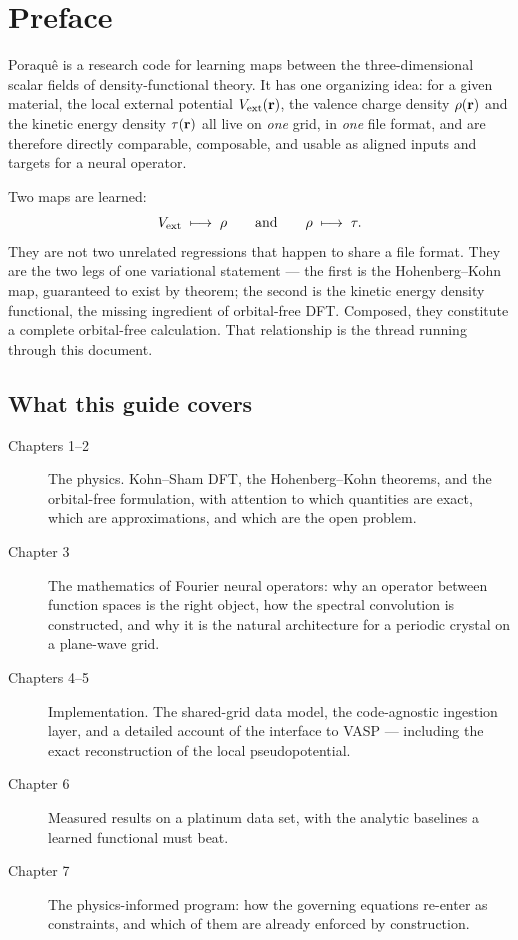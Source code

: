 \chapter*{Preface}

Poraqu\^e is a research code for learning maps between the three-dimensional
scalar fields of density-functional theory. It has one organizing idea: for a
given material, the local external potential $V_{\mathrm{ext}}(\mathbf{r})$, the valence charge
density $\rho(\mathbf{r})$ and the kinetic energy density $\tau(\mathbf{r})$ all live on
\emph{one} grid, in \emph{one} file format, and are therefore directly
comparable, composable, and usable as aligned inputs and targets for a neural
operator.

Two maps are learned:
\[
  V_{\mathrm{ext}} \;\longmapsto\; \rho
  \qquad\text{and}\qquad
  \rho \;\longmapsto\; \tau .
\]
They are not two unrelated regressions that happen to share a file format. They
are the two legs of one variational statement --- the first is the
Hohenberg--Kohn map, guaranteed to exist by theorem; the second is the kinetic
energy density functional, the missing ingredient of orbital-free DFT. Composed,
they constitute a complete orbital-free calculation. That relationship is the
thread running through this document.

\section*{What this guide covers}

\begin{description}
  \item[Chapters 1--2] The physics. Kohn--Sham DFT, the Hohenberg--Kohn
    theorems, and the orbital-free formulation, with attention to which
    quantities are exact, which are approximations, and which are the open
    problem.
  \item[Chapter 3] The mathematics of Fourier neural operators: why an operator
    between function spaces is the right object, how the spectral convolution
    is constructed, and why it is the natural architecture for a periodic
    crystal on a plane-wave grid.
  \item[Chapters 4--5] Implementation. The shared-grid data model, the
    code-agnostic ingestion layer, and a detailed account of the interface to
    VASP --- including the exact reconstruction of the local pseudopotential.
  \item[Chapter 6] Measured results on a platinum data set, with the analytic
    baselines a learned functional must beat.
  \item[Chapter 7] The physics-informed program: how the governing equations
    re-enter as constraints, and which of them are already enforced by
    construction.
\end{description}

